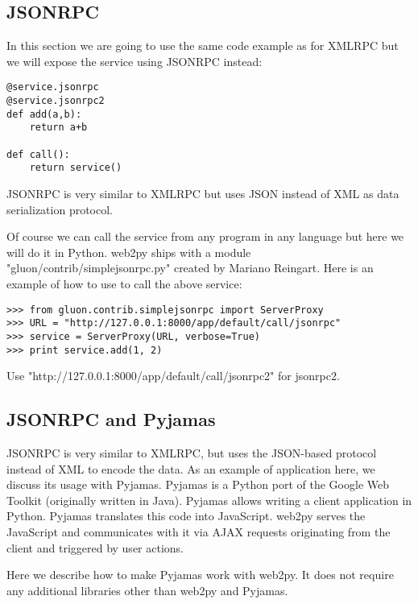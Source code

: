 \documentclass[justified,sixbynine,notoc]{tufte-book}
\def\inxx#1{\index{#1}}
\begin{document}
\begin{fullwidth}
\goodbreak\subsection{JSONRPC}

\inxx{JSONRPC}

In this section we are going to use the same code example as for XMLRPC but we will expose the service using JSONRPC instead:

\begin{lstlisting}
@service.jsonrpc
@service.jsonrpc2
def add(a,b):
    return a+b

def call():
    return service()
\end{lstlisting}

JSONRPC is very similar to XMLRPC but uses JSON instead of XML as data serialization protocol.

Of course we can call the service from any program in any language but here we will do it in Python. web2py ships with a module "gluon/contrib/simplejsonrpc.py" created by Mariano Reingart. Here is an example of how to use to call the above service:

\begin{lstlisting}
>>> from gluon.contrib.simplejsonrpc import ServerProxy
>>> URL = "http://127.0.0.1:8000/app/default/call/jsonrpc"
>>> service = ServerProxy(URL, verbose=True)
>>> print service.add(1, 2)
\end{lstlisting}

Use "http://127.0.0.1:8000/app/default/call/jsonrpc2" for jsonrpc2.

\goodbreak\subsection{JSONRPC and Pyjamas}

\inxx{JSONRPC} \inxx{Pyjamas}

JSONRPC is very similar to XMLRPC, but uses the JSON-based protocol instead of XML to encode the data. As an example of application here, we discuss its usage with Pyjamas. Pyjamas is a Python port of the Google Web Toolkit (originally written in Java). Pyjamas allows writing a client application in Python. Pyjamas translates this code into JavaScript. web2py serves the JavaScript and communicates with it via AJAX requests originating from the client and triggered by user actions.

Here we describe how to make Pyjamas work with web2py. It does not require any additional libraries other than web2py and Pyjamas.


\end{fullwidth}
\end{document}
